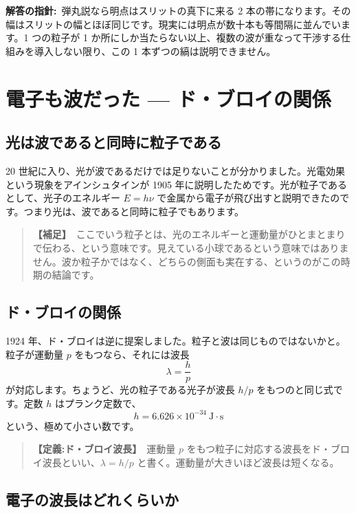 \documentclass{article}
\begin{document}
\textbf{解答の指針:}\ 弾丸説なら明点はスリットの真下に来る 2 本の帯になります。その幅はスリットの幅とほぼ同じです。現実には明点が数十本も等間隔に並んでいます。1 つの粒子が 1 か所にしか当たらない以上、複数の波が重なって干渉する仕組みを導入しない限り、この 1 本ずつの縞は説明できません。

\section{電子も波だった — ド・ブロイの関係}

\subsection{光は波であると同時に粒子である}

20 世紀に入り、光が波であるだけでは足りないことが分かりました。光電効果という現象をアインシュタインが 1905 年に説明したためです。光が粒子であるとして、光子のエネルギー \( E = h \nu \) で金属から電子が飛び出すと説明できたのです。つまり光は、波であると同時に粒子でもあります。

\begin{quote}
\textbf{【補足】}\ ここでいう粒子とは、光のエネルギーと運動量がひとまとまりで伝わる、という意味です。見えている小球であるという意味ではありません。波か粒子かではなく、どちらの側面も実在する、というのがこの時期の結論です。
\end{quote}

\subsection{ド・ブロイの関係}

1924 年、ド・ブロイは逆に提案しました。粒子と波は同じものではないかと。粒子が運動量 \(p\) をもつなら、それには波長
\[ \lambda = \frac{h}{p} \]
が対応します。ちょうど、光の粒子である光子が波長 \(h / p\) をもつのと同じ式です。定数 \(h\) はプランク定数で、
\[ h = 6.626 \times 10^{-34} \ \mathrm{J \cdot s} \]
という、極めて小さい数です。

\begin{quote}
\textbf{【定義:ド・ブロイ波長】}\ 運動量 \(p\) をもつ粒子に対応する波長をド・ブロイ波長といい、\( \lambda = h / p \) と書く。運動量が大きいほど波長は短くなる。
\end{quote}

\subsection{電子の波長はどれくらいか}
\end{document}
